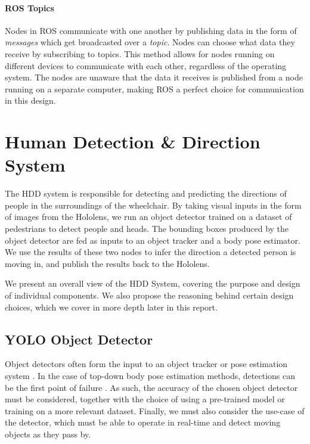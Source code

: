 \paragraph{ROS Topics} Nodes in ROS communicate with one another by publishing data in the form of \textit{messages} which get broadcasted over a \textit{topic}. Nodes can choose what data they receive by subscribing to topics. This method allows for nodes running on different devices to communicate with each other, regardless of the operating system. The nodes are unaware that the data it receives is published from a node running on a separate computer, making ROS a perfect choice for communication in this design.

\section{Human Detection \& Direction System}
The HDD system is responsible for detecting and predicting the directions of people in the surroundings of the wheelchair. By taking visual inputs in the form of images from the Hololens, we run an object detector trained on a dataset of pedestrians to detect people and heads. The bounding boxes produced by the object detector are fed as inputs to an object tracker and a body pose estimator. We use the results of these two nodes to infer the direction a detected person is moving in, and publish the results back to the Hololens.


We present an overall view of the HDD System, covering the purpose and design of individual components. We also propose the reasoning behind certain design choices, which we cover in more depth later in this report.

\subsection{YOLO Object Detector} \label{sec:yolo}
Object detectors often form the input to an object tracker or pose estimation system \cite{Bewley2016, Jin2017}. In the case of top-down body pose estimation methods, detections can be the first point of failure \cite{Insafutdinov}. As such, the accuracy of the chosen object detector must be considered, together with the choice of using a pre-trained model or training on a more relevant dataset. Finally, we must also consider the use-case of the detector, which must be able to operate in real-time and detect moving objects as they pass by.

